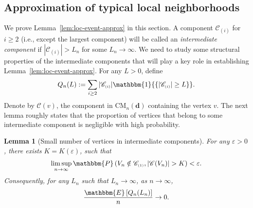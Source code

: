 \documentclass[11pt,a4paper, reqno]{article}
\numberwithin{equation}{section}
\numberwithin{equation}{section}
\def\sss{\scriptscriptstyle}
\newcommand{\prob}[1]{\ensuremath{\mathbbm{P}\left(#1\right)}}
\newcommand{\expt}[1]{\ensuremath{\mathbbm{E}\left[#1\right]}}
\newcommand{\ind}[1]{\ensuremath{\mathbbm{1}{\left\{#1\right\}}}}
\newcommand{\1}{\ensuremath{\mathbbm{1}}}
\newcommand{\CM}{\ensuremath{\mathrm{CM}_n(\boldsymbol{d})}}
\newcommand{\C}{\mathscr{C}_{\sss (1)}}
\newtheorem{lemma}[theorem]{Lemma}
\numberwithin{equation}{section}
\numberwithin{theorem}{section}
\begin{document}
\subsection{Approximation of typical local neighborhoods}
\label{sec:local_approx}
%
%
%
We prove Lemma~\ref{lem:loc-event-approx} in this section. 
A component $\mathscr{C}_{\sss (i)}$ for $i\geq 2$ (i.e., except the largest component) will be called an  \emph{intermediate component} if $|\mathscr{C}_{\sss (i)}|>L_n$ for some $L_n\to\infty$.
We need to study some structural properties of the intermediate components that will play a key role in establishing Lemma~\ref{lem:loc-event-approx}.
For any $L>0$, define
\begin{equation}
 Q_n(L):=\sum_{i\geq 2}|\mathscr{C}_{\sss (i)}|\ind{|\mathscr{C}_{\sss (i)}| \geq L}.
\end{equation}
Denote by $\mathscr{C}(v)$, the component in $\CM$ containing the vertex $v$.
The next lemma roughly states that the proportion of vertices that belong to some
intermediate component is negligible with high probability.
\begin{lemma}[Small number of vertices in intermediate components] \label{lem:small-no-giant} For any $\varepsilon >0$, there exists $K=K(\varepsilon)$, such that
\begin{equation}\label{CVn-small}
 \limsup_{n\to\infty}\prob{V_n\notin \C, |\mathscr{C}(V_n)|>K}<\varepsilon.
\end{equation}
Consequently, for any $L_n$ such that $L_n\to\infty$, as $n\to\infty$, 
\begin{equation}\label{eq:no-giant-small}
 \frac{\expt{Q_n(L_n)}}{n}\to 0.
\end{equation}
\end{lemma}
\end{document}
